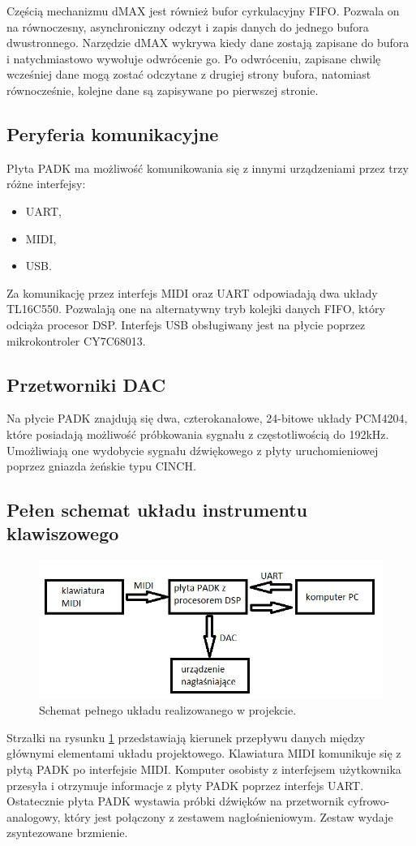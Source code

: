 Częścią mechanizmu dMAX jest również bufor cyrkulacyjny FIFO. Pozwala on na równoczesny, asynchroniczny odczyt i zapis danych do jednego bufora dwustronnego. Narzędzie dMAX wykrywa kiedy dane zostają zapisane do bufora i natychmiastowo wywołuje odwrócenie go. Po odwróceniu, zapisane chwilę wcześniej dane mogą zostać odczytane z drugiej strony bufora, natomiast równocześnie, kolejne dane są zapisywane po pierwszej stronie.

\subsection{Peryferia komunikacyjne}
Płyta PADK ma możliwość komunikowania się z innymi urządzeniami przez trzy różne interfejsy:
\begin{itemize}
	\item UART,
	\item MIDI,
	\item USB.
\end{itemize}
Za komunikację przez interfejs MIDI oraz UART odpowiadają dwa układy TL16C550. Pozwalają one na alternatywny tryb kolejki danych FIFO, który odciąża procesor DSP. Interfejs USB obsługiwany jest na płycie poprzez mikrokontroler CY7C68013.

\subsection{Przetworniki DAC}
Na płycie PADK znajdują się dwa, czterokanałowe, 24-bitowe układy PCM4204, które posiadają możliwość próbkowania sygnału z częstotliwością do 192kHz. Umożliwiają one wydobycie sygnału dźwiękowego z płyty uruchomieniowej poprzez gniazda żeńskie typu CINCH.

\subsection{Pełen schemat układu instrumentu klawiszowego}
\begin{figure}[H]
	\centering
	\includegraphics[width=12cm]{./grafiki/real_pelen_uklad}
	\captionsetup{justification=centering}
	\caption{Schemat pełnego układu realizowanego w projekcie.}
	\label{rys:real_uklad}
\end{figure}
Strzałki na rysunku \ref{rys:real_uklad} przedstawiają kierunek przepływu danych między głównymi elementami układu projektowego. Klawiatura MIDI komunikuje się z płytą PADK po interfejsie MIDI. Komputer osobisty z interfejsem użytkownika przesyła i otrzymuje informacje z płyty PADK poprzez interfejs UART. Ostatecznie płyta PADK wystawia próbki dźwięków na przetwornik cyfrowo-analogowy, który jest połączony z zestawem nagłośnieniowym. Zestaw wydaje zsyntezowane brzmienie.

